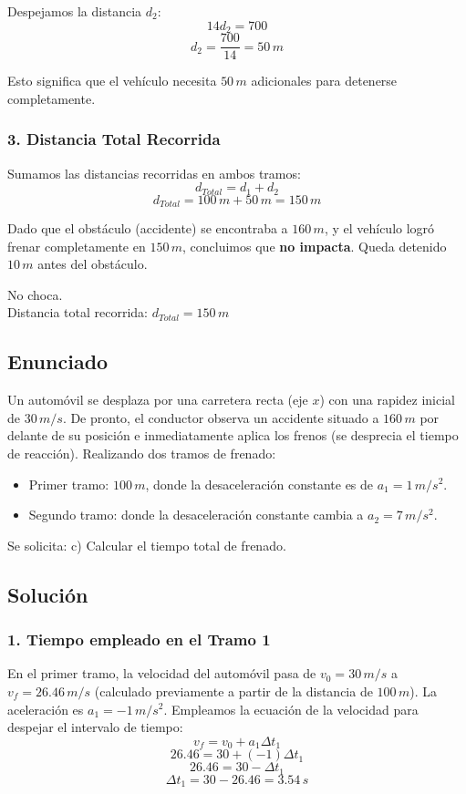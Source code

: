\documentclass[12pt, a4paper]{article}
\begin{document}
Despejamos la distancia $d_2$:
$$ 14d_2 = 700 $$
$$ d_2 = \frac{700}{14} = 50 \, \si{m} $$

Esto significa que el vehículo necesita $50 \, \si{m}$ adicionales para detenerse completamente.

\subsubsection*{3. Distancia Total Recorrida}
Sumamos las distancias recorridas en ambos tramos:
$$ d_{Total} = d_1 + d_2 $$
$$ d_{Total} = 100 \, \si{m} + 50 \, \si{m} = 150 \, \si{m} $$

Dado que el obstáculo (accidente) se encontraba a $160 \, \si{m}$, y el vehículo logró frenar completamente en $150 \, \si{m}$, concluimos que \textbf{no impacta}. Queda detenido $10 \, \si{m}$ antes del obstáculo.

\begin{tcolorbox}[colback=green!5!white, colframe=green!50!black, title=Respuesta Final]
\centering 
\Large No choca. \\
\vspace{0.2cm}
\normalsize Distancia total recorrida: $d_{Total} = 150 \, \si{m}$
\end{tcolorbox}

\newpage

\subsection*{Enunciado}
Un automóvil se desplaza por una carretera recta (eje $x$) con una rapidez inicial de $30 \, \si{m/s}$. De pronto, el conductor observa un accidente situado a $160 \, \si{m}$ por delante de su posición e inmediatamente aplica los frenos (se desprecia el tiempo de reacción). Realizando dos tramos de frenado:
\begin{itemize}
    \item Primer tramo: $100 \, \si{m}$, donde la desaceleración constante es de $a_1 = 1 \, \si{m/s^2}$.
    \item Segundo tramo: donde la desaceleración constante cambia a $a_2 = 7 \, \si{m/s^2}$.
\end{itemize}
Se solicita:
c) Calcular el tiempo total de frenado.

\subsection*{Solución}

\subsubsection*{1. Tiempo empleado en el Tramo 1}
En el primer tramo, la velocidad del automóvil pasa de $v_0 = 30 \, \si{m/s}$ a $v_f = 26.46 \, \si{m/s}$ (calculado previamente a partir de la distancia de $100 \, \si{m}$). La aceleración es $a_1 = -1 \, \si{m/s^2}$.
Empleamos la ecuación de la velocidad para despejar el intervalo de tiempo:
$$ v_f = v_0 + a_1\Delta t_1 $$
$$ 26.46 = 30 + (-1)\Delta t_1 $$
$$ 26.46 = 30 - \Delta t_1 $$
$$ \Delta t_1 = 30 - 26.46 = 3.54 \, \si{s} $$
\end{document}
